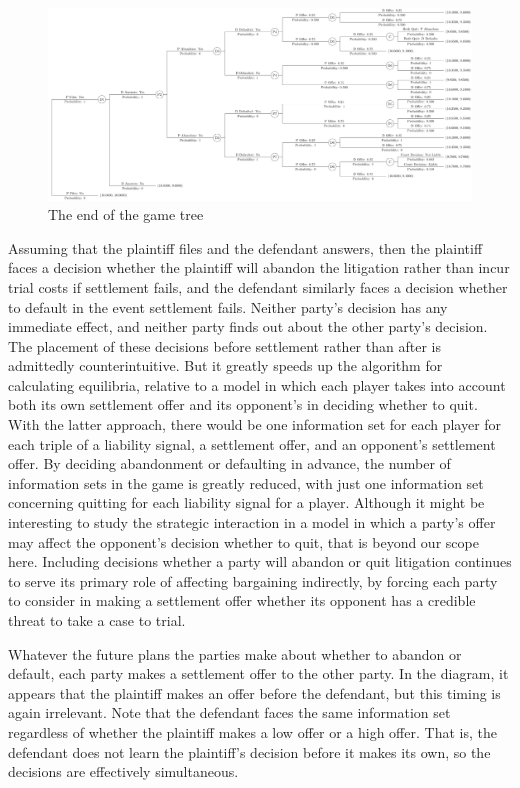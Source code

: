\documentclass{article}
\begin{document}
\begin{figure}[h!]
\centering
\includegraphics[scale=0.25, trim={0in 0in 0in 0in}, clip]{../Figures/game tree 2x2x2 end.pdf}
\caption{The end of the game tree}
\label{fig:gametree2x2x2end}
\end{figure}

Assuming that the plaintiff files and the defendant answers, then the plaintiff faces a decision whether the plaintiff will abandon the litigation rather than incur trial costs if settlement fails, and the defendant similarly faces a decision whether to default in the event settlement fails. Neither party's decision has any immediate effect, and neither party finds out about the other party's decision. The placement of these decisions before settlement rather than after is admittedly counterintuitive. But it greatly speeds up the algorithm for calculating equilibria, relative to a model in which each player takes into account both its own settlement offer and its opponent's in deciding whether to quit. With the latter approach, there would be one information set for each player for each triple of a liability signal, a settlement offer, and an opponent's settlement offer. By deciding abandonment or defaulting in advance, the number of information sets in the game is greatly reduced, with just one information set concerning quitting for each liability signal for a player. Although it might be interesting to study the strategic interaction in a model in which a party's offer may affect the opponent's decision whether to quit, that is beyond our scope here. Including decisions whether a party will abandon or quit litigation continues to serve its primary role of affecting bargaining indirectly, by forcing each party to consider in making a settlement offer whether its opponent has a credible threat to take a case to trial. 

Whatever the future plans the parties make about whether to abandon or default, each party makes a settlement offer to the other party. In the diagram, it appears that the plaintiff makes an offer before the defendant, but this timing is again irrelevant. Note that the defendant faces the same information set regardless of whether the plaintiff makes a low offer or a high offer. That is, the defendant does not learn the plaintiff's decision before it makes its own, so the decisions are effectively simultaneous. 
\end{document}
